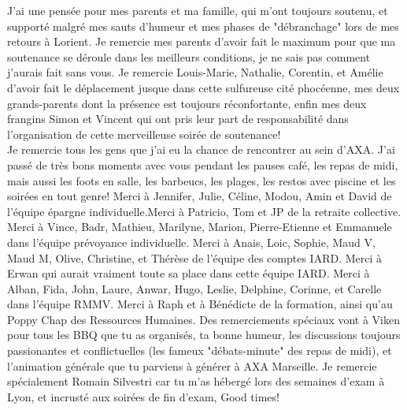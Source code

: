 J'ai une pensée pour mes parents et ma famille, qui m'ont toujours soutenu, et supporté malgré mes sauts d'humeur et mes phases de "débranchage" lors de mes retours à Lorient. Je remercie mes parents d'avoir fait le maximum pour que ma soutenance se déroule dans les meilleurs conditions, je ne sais pas comment j'aurais fait sans vous. Je remercie Louis-Marie, Nathalie, Corentin, et Amélie d'avoir fait le déplacement jusque dans cette sulfureuse cité phocéenne, mes deux grands-parents dont la présence est toujours réconfortante, enfin mes deux frangins Simon et Vincent qui ont pris leur part de responsabilité dans l'organisation de cette merveilleuse soirée de soutenance!
\\

Je remercie tous les gens que j'ai eu la chance de rencontrer au sein d'AXA. J'ai passé de très bons moments avec vous pendant les pauses café, les repas de midi, mais aussi les foots en salle, les barbeucs, les plages, les restos avec piscine et les soirées en tout genre! Merci à Jennifer, Julie, Céline, Modou, Amin et David de l'équipe épargne individuelle.Merci à Patricio, Tom et JP de la retraite collective. Merci à Vince, Badr, Mathieu, Marilyne, Marion, Pierre-Etienne et Emmanuele dans l'équipe prévoyance individuelle. Merci à Anais, Loic, Sophie, Maud V, Maud M, Olive, Christine, et Thérèse de l'équipe des comptes IARD. Merci à Erwan qui aurait vraiment toute sa place dans cette équipe IARD. Merci à Alban, Fida, John, Laure, Anwar, Hugo, Leslie, Delphine, Corinne, et Carelle dans l'équipe RMMV. Merci à Raph et à Bénédicte de la formation, ainsi qu'au Poppy Chap des Ressources Humaines. Des remerciements spéciaux vont à Viken pour tous les BBQ que tu as organisés, ta bonne humeur, les discussions toujours passionantes et conflictuelles (les fameux "débats-minute" des repas de midi), et l'animation générale que tu parviens à générer à AXA Marseille.  Je remercie spécialement Romain Silvestri car tu m'as hébergé lors des semaines d'exam à Lyon, et incrusté aux soirées de fin d'exam, Good times!
\\

